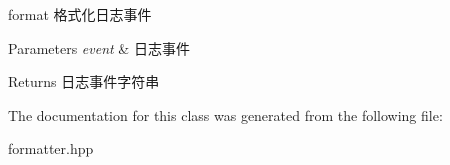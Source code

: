 format 格式化日志事件 


\begin{DoxyParams}{Parameters}
{\em event} & 日志事件\\
\hline
\end{DoxyParams}
\begin{DoxyReturn}{Returns}
日志事件字符串 
\end{DoxyReturn}


The documentation for this class was generated from the following file\+:\begin{DoxyCompactItemize}
\item 
formatter.\+hpp\end{DoxyCompactItemize}

